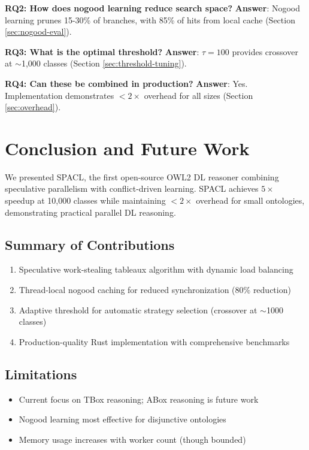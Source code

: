 \documentclass[preprint,12pt]{elsarticle}
\begin{document}
\textbf{RQ2: How does nogood learning reduce search space?}  
\textbf{Answer}: Nogood learning prunes 15-30\% of branches, with 85\% of hits from local cache (Section \ref{sec:nogood-eval}).

\textbf{RQ3: What is the optimal threshold?}  
\textbf{Answer}: $\tau = 100$ provides crossover at $\sim$1,000 classes (Section \ref{sec:threshold-tuning}).

\textbf{RQ4: Can these be combined in production?}  
\textbf{Answer}: Yes. Implementation demonstrates $<2\times$ overhead for all sizes (Section \ref{sec:overhead}).

\section{Conclusion and Future Work}
\label{sec:conclusion}

We presented SPACL, the first open-source OWL2 DL reasoner combining speculative parallelism with conflict-driven learning. SPACL achieves $5\times$ speedup at 10,000 classes while maintaining $<2\times$ overhead for small ontologies, demonstrating practical parallel DL reasoning.

\subsection{Summary of Contributions}
\label{sec:summary}

\begin{enumerate}
    \item Speculative work-stealing tableaux algorithm with dynamic load balancing
    \item Thread-local nogood caching for reduced synchronization (80\% reduction)
    \item Adaptive threshold for automatic strategy selection (crossover at $\sim$1000 classes)
    \item Production-quality Rust implementation with comprehensive benchmarks
\end{enumerate}

\subsection{Limitations}
\label{sec:limitations}

\begin{itemize}
    \item Current focus on TBox reasoning; ABox reasoning is future work
    \item Nogood learning most effective for disjunctive ontologies
    \item Memory usage increases with worker count (though bounded)
\end{itemize}
\end{document}
